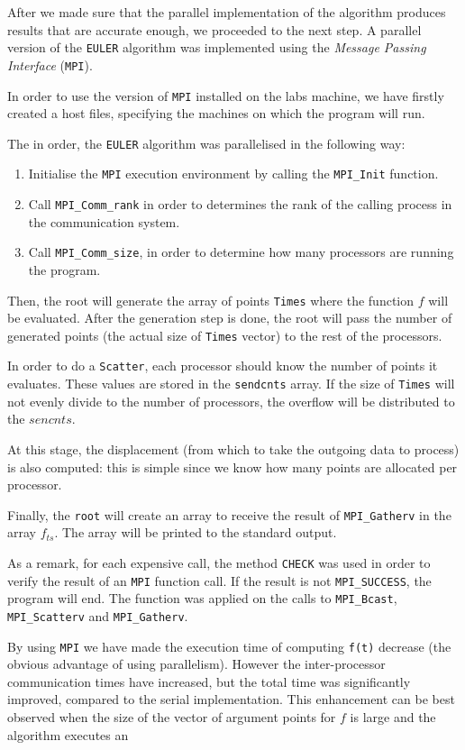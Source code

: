 After we made sure that the parallel implementation of the algorithm produces results that
are accurate enough, we proceeded to the next step.
A parallel version of the \texttt{EULER} algorithm was implemented using the \emph{Message Passing Interface} (\texttt{MPI}).

In order to use the version of \texttt{MPI} installed on the labs machine, we have firstly created a host files,
specifying  the machines on which the program will run.

The in order, the \texttt{EULER} algorithm was parallelised in the following way:
\begin{enumerate}
 \item{Initialise the \texttt{MPI} execution environment by calling the \texttt{MPI\_Init} function.}
 \item{Call \texttt{MPI\_Comm\_rank} in order to determines the rank of the calling process in the communication system.}
 \item{Call \texttt{MPI\_Comm\_size}, in order to determine how many processors are running the program.}
\end{enumerate}

Then, the root will generate the array of points \texttt{Times} where the function $f$ will be evaluated.
After the generation step is done, the root will pass the number of generated points (the actual size of 
\texttt{Times} vector) to the rest of the processors.
\newline

In order to do a \texttt{Scatter}, each processor should know the number of points it evaluates. These
values are stored in the \texttt{sendcnts} array. If the size of \texttt{Times} will not evenly divide to the
number of processors, the overflow will be distributed to the $sencnts$.

At this stage, the displacement (from which to take the outgoing data to process) is also computed: 
this is simple since we know how many points are allocated per processor.


Finally, the \texttt{root} will create an array to receive the result of \texttt{MPI\_Gatherv} in the array $f_{ts}$.
The array will be printed to the standard output.

As a remark, for each expensive call, the method \texttt{CHECK} was used in order to verify the result of an \texttt{MPI} function call. 
If the result is not \texttt{MPI\_SUCCESS}, the program will end. The function was applied on the calls to \texttt{MPI\_Bcast}, \texttt{MPI\_Scatterv}  and \texttt{MPI\_Gatherv}.

By using \texttt{MPI} we have made the execution time of computing \texttt{f(t)} decrease (the obvious advantage of using parallelism). 
However the inter-processor communication times have increased, but the total time was significantly improved, compared
to the serial implementation. This enhancement can be best observed when the size of the vector of argument points for $f$ is large and the algorithm executes an

